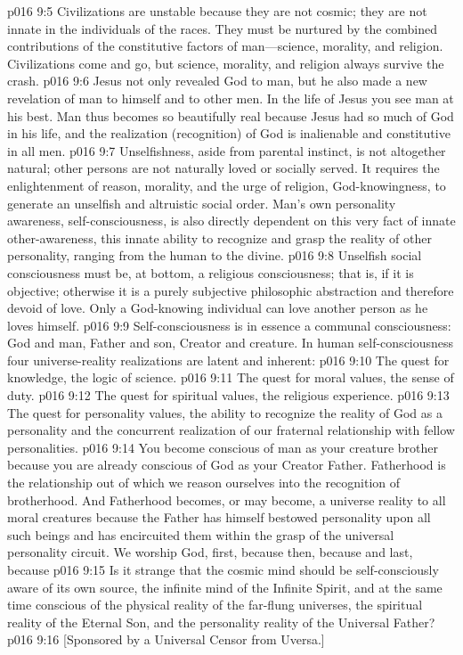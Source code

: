 \vs p016 9:5 Civilizations are unstable because they are not cosmic; they are not innate in the individuals of the races. They must be nurtured by the combined contributions of the constitutive factors of man---science, morality, and religion. Civilizations come and go, but science, morality, and religion always survive the crash.
\vs p016 9:6 Jesus not only revealed God to man, but he also made a new revelation of man to himself and to other men. In the life of Jesus you see man at his best. Man thus becomes so beautifully real because Jesus had so much of God in his life, and the realization (recognition) of God is inalienable and constitutive in all men.
\pc \vs p016 9:7 Unselfishness, aside from parental instinct, is not altogether natural; other persons are not naturally loved or socially served. It requires the enlightenment of reason, morality, and the urge of religion, God\hyp{}knowingness, to generate an unselfish and altruistic social order. Man’s own personality awareness, self\hyp{}consciousness, is also directly dependent on this very fact of innate other\hyp{}awareness, this innate ability to recognize and grasp the reality of other personality, ranging from the human to the divine.\plusone
\vs p016 9:8 Unselfish social consciousness must be, at bottom, a religious consciousness; that is, if it is objective; otherwise it is a purely subjective philosophic abstraction and therefore devoid of love. Only a God\hyp{}knowing individual can love another person as he loves himself.\plusone
\vs p016 9:9 Self\hyp{}consciousness is in essence a communal consciousness: God and man, Father and son, Creator and creature. In human self\hyp{}consciousness four universe\hyp{}reality realizations are latent and inherent:
\pc \vs p016 9:10 \bibnobreakspace The quest for knowledge, the logic of science.
\vs p016 9:11 \bibnobreakspace The quest for moral values, the sense of duty.
\vs p016 9:12 \bibnobreakspace The quest for spiritual values, the religious experience.
\vs p016 9:13 \bibnobreakspace The quest for personality values, the ability to recognize the reality of God as a personality and the concurrent realization of our fraternal relationship with fellow personalities.
\pc \vs p016 9:14 You become conscious of man as your creature brother because you are already conscious of God as your Creator Father. Fatherhood is the relationship out of which we reason ourselves into the recognition of brotherhood. And Fatherhood becomes, or may become, a universe reality to all moral creatures because the Father has himself bestowed personality upon all such beings and has encircuited them within the grasp of the universal personality circuit. We worship God, first, because  then, because  and last, because \plusone
\vs p016 9:15 Is it strange that the cosmic mind should be self\hyp{}consciously aware of its own source, the infinite mind of the Infinite Spirit, and at the same time conscious of the physical reality of the far\hyp{}flung universes, the spiritual reality of the Eternal Son, and the personality reality of the Universal Father?
\vsetoff
\vs p016 9:16 [Sponsored by a Universal Censor from Uversa.]
